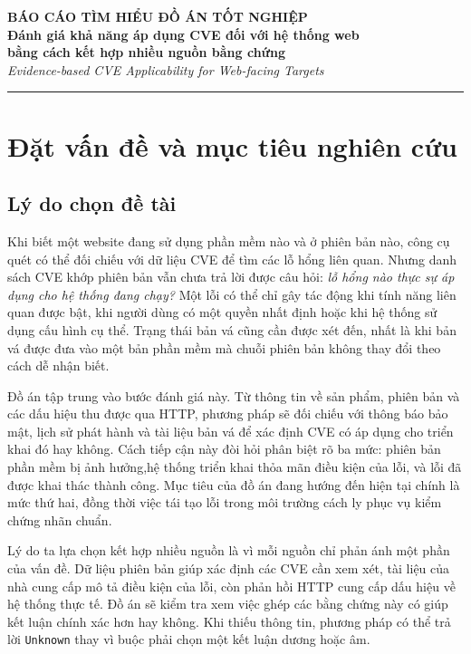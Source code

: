 \documentclass[11pt,a4paper]{article}
\begin{document}
\begin{center}
  {\Large\bfseries BÁO CÁO TÌM HIỂU ĐỒ ÁN TỐT NGHIỆP}\\[4mm]
  {\large\bfseries Đánh giá khả năng áp dụng CVE đối với hệ thống web\\[1mm]
  bằng cách kết hợp nhiều nguồn bằng chứng}\\[3mm]
  {\normalsize\itshape Evidence-based CVE Applicability for Web-facing Targets}\\[3mm]

\end{center}
\vspace{1mm}
\hrule
\vspace{2mm}

\section{Đặt vấn đề và mục tiêu nghiên cứu}

\subsection{Lý do chọn đề tài}

Khi biết một website đang sử dụng phần mềm nào và ở phiên bản nào, công cụ quét có thể đối chiếu với dữ liệu CVE để tìm các lỗ hổng liên quan. Nhưng danh sách CVE khớp phiên bản vẫn chưa trả lời được câu hỏi: \emph{lỗ hổng nào thực sự áp dụng cho hệ thống đang chạy?} Một lỗi có thể chỉ gây tác động khi tính năng liên quan được bật, khi người dùng có một quyền nhất định hoặc khi hệ thống sử dụng cấu hình cụ thể. Trạng thái bản vá cũng cần được xét đến, nhất là khi bản vá được đưa vào một bản phần mềm mà chuỗi phiên bản không thay đổi theo cách dễ nhận biết.

Đồ án tập trung vào bước đánh giá này. Từ thông tin về sản phẩm, phiên bản và các dấu hiệu thu được qua HTTP, phương pháp sẽ đối chiếu với thông báo bảo mật, lịch sử phát hành và tài liệu bản vá để xác định CVE có áp dụng cho triển khai đó hay không. Cách tiếp cận này đòi hỏi phân biệt rõ ba mức: phiên bản phần mềm bị ảnh hưởng,hệ thống triển khai thỏa mãn điều kiện của lỗi, và lỗi đã được khai thác thành công. Mục tiêu của đồ án đang hướng đến hiện tại chính là mức thứ hai, đồng thời việc tái tạo lỗi trong môi trường cách ly phục vụ kiểm chứng nhãn chuẩn.

Lý do ta lựa chọn kết hợp nhiều nguồn là vì mỗi nguồn chỉ phản ánh một phần của vấn đề. Dữ liệu phiên bản giúp xác định các CVE cần xem xét, tài liệu của nhà cung cấp mô tả điều kiện của lỗi, còn phản hồi HTTP cung cấp dấu hiệu về hệ thống thực tế. Đồ án sẽ kiểm tra xem việc ghép các bằng chứng này có giúp kết luận chính xác hơn hay không. Khi thiếu thông tin, phương pháp có thể trả lời \texttt{Unknown} thay vì buộc phải chọn một kết luận dương hoặc âm.
\end{document}
